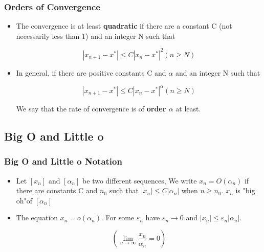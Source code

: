 \documentclass[notheorems,mathserif,table,compress]{beamer}  %
\begin{document}
\begin{frame}
\frametitle{Orders of Convergence}
 \begin{itemize}
 \item The convergence is at least \textbf{quadratic} if there are a constant C (not necessarily less
than 1) and an integer N such that 
   
 \begin{displaymath}
 |x_{n+1}-x^*|\leq  C|x_n-x^*|^2  (n\geq  N)
 \end{displaymath}
 
 \item In general, if there are positive constants C and $\alpha$ and an integer N such that 

 \begin{displaymath}
 |x_{n+1}-x^*|\leq  C|x_n-x^*|^\alpha  (n\geq  N)
 \end{displaymath}

 We say that the rate of convergence is of \textbf{order $\alpha$}  at least.
  \end{itemize}
\end{frame}

\subsection{Big O and Little o }

\begin{frame}
  \frametitle{Big O and Little o Notation}
  \begin{itemize}
  \item Let $[x_n]$ and $[\alpha_n]$ be two different  sequences, We write $x_n=O(\alpha_n)$
  if there are constants C and $n_0$ such that $|x_n| \leq C|\alpha_n|$ when $n\geq n_0$. $x_n$ is "big oh"of $[\alpha_n]$   
  \newline
  \item  The  equation $x_n=o(\alpha_n)$. For some $\varepsilon_n$ have   $\varepsilon_n \rightarrow 0$ and $|x_n|\leq \varepsilon_n|\alpha_n|$. 
  
  \begin{displaymath}
  (\lim_{n \to \infty}\frac{x_n}{\alpha_n}=0) 
  \end{displaymath} 

  \end{itemize}
\end{frame}
\end{document}
